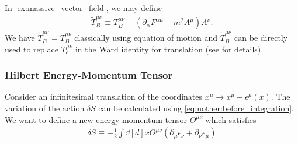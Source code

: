 \documentclass[10pt]{article}
\begin{document}
In \cref{ex:massive_vector_field}, we may define
\begin{align}
    \tilde{T}^{\mu\nu}_B\equiv T^{\mu\nu}_B-\left(\partial_\alpha F^{\alpha\mu}-m^2 A^\mu\right)A^\nu.
\end{align}
We have $\tilde{T}^{\mu\nu}_B=T^{\mu\nu}_B$ classically using equation of motion and $\tilde{T}^{\mu\nu}_B$ can be directly used to replace $T^{\mu\nu}_c$ in the Ward identity for translation (see \cite{DiFrancesco:1997nk} for details).
\subsubsection{Hilbert Energy-Momentum Tensor}
Consider an infinitesimal translation of the coordinates $x^\mu\to x^\mu+\epsilon^\mu(x)$.
The variation of the action $\delta S$ can be calculated using \cref{eq:nother:before_integration}.
We want to define a new energy momentum tensor $\Theta^{\mu\nu}$ which satisfies
\begin{align}
    \delta S\equiv-\frac{1}{2}\int\dd[d]{x}\Theta^{\mu\nu}\left(\partial_\mu\epsilon_\nu+\partial_\nu\epsilon_\mu\right)\label{eq:alternate_tensor:requirement}
\end{align}

\end{document}
